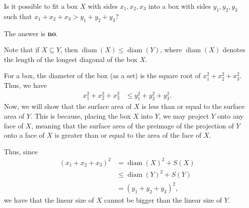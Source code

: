 \documentclass[10pt]{mypackage}
\begin{document}
%

\begin{problem}
  Is it possible to fit a box $X$ with sides $x_1,x_2,x_3$ into a box with sides $y_1,y_2,y_3$ such that $x_1 + x_2 + x_3 > y_1 + y_2 + y_3$?
\end{problem}
\begin{solution}
  The answer is \textbf{no}.\newline

  Note that if $X\subseteq Y$, then $\operatorname{diam}\left( X \right) \leq \operatorname{diam}\left( Y \right)$, where $\operatorname{diam}\left( X \right)$ denotes the length of the longest diagonal of the box $X$.\newline

  For a box, the diameter of the box (as a set) is the square root of $x_1^2 + x_2^2 + x_3^2$. Thus, we have
  \begin{align*}
    x_1^2 + x_2^2 + x_3^2 &\leq y_1^2 + y_2^2 + y_3^2.
  \end{align*}
  Now, we will show that the surface area of $X$ is less than or equal to the surface area of $Y$. This is because, placing the box $X$ into $Y$, we may project $Y$ onto any face of $X$, meaning that the surface area of the preimage of the projection of $Y$ onto a face of $X$ is greater than or equal to the area of the face of $X$.\newline

  Thus, since
  \begin{align*}
    \left( x_1 + x_2 + x_3 \right)^2 &= \operatorname{diam}\left( X \right)^2 + S(X)\\
                                     &\leq \operatorname{diam}\left( Y \right)^2 + S(Y)\\
                                     &= \left( y_1 + y_2 + y_3 \right)^2,
  \end{align*}
  we have that the linear size of $X$ cannot be bigger than the linear size of $Y$.
\end{solution}
\end{document}
